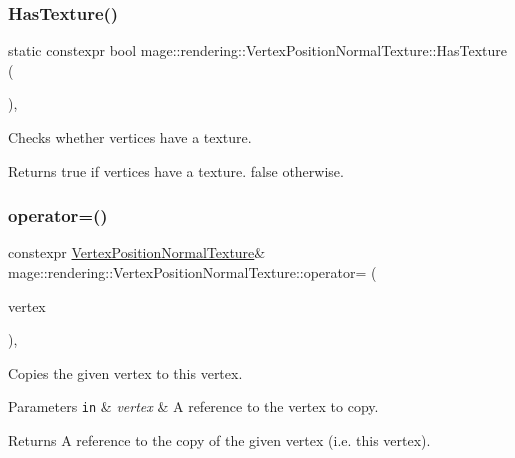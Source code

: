 \subsubsection{\texorpdfstring{Has\+Texture()}{HasTexture()}}
{\footnotesize\ttfamily static constexpr bool mage\+::rendering\+::\+Vertex\+Position\+Normal\+Texture\+::\+Has\+Texture (\begin{DoxyParamCaption}{ }\end{DoxyParamCaption})\hspace{0.3cm}{\ttfamily [static]}, {\ttfamily [noexcept]}}

Checks whether vertices have a texture.

\begin{DoxyReturn}{Returns}
{\ttfamily true} if vertices have a texture. {\ttfamily false} otherwise. 
\end{DoxyReturn}
\hypertarget{structmage_1_1rendering_1_1_vertex_position_normal_texture_ab41cec4ed6c1a38cd4bc5c73e78ec747}{}\label{structmage_1_1rendering_1_1_vertex_position_normal_texture_ab41cec4ed6c1a38cd4bc5c73e78ec747} 
\subsubsection{\texorpdfstring{operator=()}{operator=()}\hspace{0.1cm}{\footnotesize\ttfamily [1/2]}}
{\footnotesize\ttfamily constexpr \hyperlink{structmage_1_1rendering_1_1_vertex_position_normal_texture}{Vertex\+Position\+Normal\+Texture}\& mage\+::rendering\+::\+Vertex\+Position\+Normal\+Texture\+::operator= (\begin{DoxyParamCaption}\item[{const \hyperlink{structmage_1_1rendering_1_1_vertex_position_normal_texture}{Vertex\+Position\+Normal\+Texture} \&}]{vertex }\end{DoxyParamCaption})\hspace{0.3cm}{\ttfamily [default]}, {\ttfamily [noexcept]}}

Copies the given vertex to this vertex.


\begin{DoxyParams}[1]{Parameters}
\mbox{\tt in}  & {\em vertex} & A reference to the vertex to copy. \\
\hline
\end{DoxyParams}
\begin{DoxyReturn}{Returns}
A reference to the copy of the given vertex (i.\+e. this vertex). 
\end{DoxyReturn}
\hypertarget{structmage_1_1rendering_1_1_vertex_position_normal_texture_a16913ccdaec3d1a0a67b4ba33cc7b7d1}{}\label{structmage_1_1rendering_1_1_vertex_position_normal_texture_a16913ccdaec3d1a0a67b4ba33cc7b7d1} 
